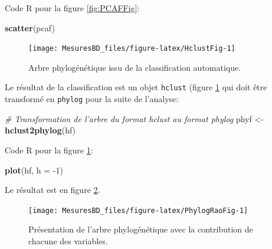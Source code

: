 \documentclass[
  11pt,
  french,
  a4paper,
  extrafontsizes,onecolumn,openright
  ]{memoir}
\newenvironment{Shaded}{\begin{snugshade}}{\end{snugshade}}
\newcommand{\CommentTok}[1]{\textcolor[rgb]{0.56,0.35,0.01}{\textit{#1}}}
\newcommand{\DataTypeTok}[1]{\textcolor[rgb]{0.13,0.29,0.53}{#1}}
\newcommand{\DecValTok}[1]{\textcolor[rgb]{0.00,0.00,0.81}{#1}}
\newcommand{\KeywordTok}[1]{\textcolor[rgb]{0.13,0.29,0.53}{\textbf{#1}}}
\newcommand{\NormalTok}[1]{#1}
\newcommand{\StringTok}[1]{\textcolor[rgb]{0.31,0.60,0.02}{#1}}
\begin{document}
\normalsize

Code R pour la figure \ref{fig:PCAFFig}:

\scriptsize

\begin{Shaded}
\begin{Highlighting}[]
\KeywordTok{scatter}\NormalTok{(pcaf)}
\end{Highlighting}
\end{Shaded}

\normalsize

\scriptsize

\begin{figure}

{\centering \texttt{[image: MesuresBD\_files/figure-latex/HclustFig-1]} 

}

\caption{Arbre phylogénétique issu de la classification automatique.}\label{fig:HclustFig}
\end{figure}

\normalsize

Le résultat de la classification est un objet \texttt{hclust} (figure \ref{fig:HclustFig} qui doit être transformé en \texttt{phylog} pour la suite de l'analyse:

\scriptsize

\begin{Shaded}
\begin{Highlighting}[]
\CommentTok{# Transformation de l'arbre du format hclust au format phylog}
\NormalTok{phyf <-}\StringTok{ }\KeywordTok{hclust2phylog}\NormalTok{(hf)}
\end{Highlighting}
\end{Shaded}

\normalsize

Code R pour la figure \ref{fig:HclustFig}:

\scriptsize

\begin{Shaded}
\begin{Highlighting}[]
\KeywordTok{plot}\NormalTok{(hf, }\DataTypeTok{h =} \DecValTok{-1}\NormalTok{)}
\end{Highlighting}
\end{Shaded}

\normalsize

Le résultat est en figure \ref{fig:PhylogRaoFig}.



\scriptsize

\begin{figure}

{\centering \texttt{[image: MesuresBD\_files/figure-latex/PhylogRaoFig-1]} 

}

\caption{Présentation de l'arbre phylogénétique avec la contribution de chacune des variables.}\label{fig:PhylogRaoFig}
\end{figure}
\end{document}
